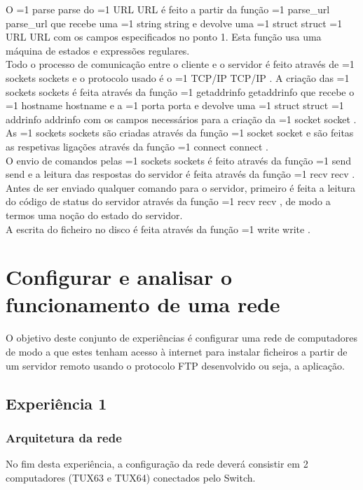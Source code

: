 \documentclass[11pt,a4paper,twocolumn]{article}
\newcommand{\hl}[2][1]{%
  \ifnum#1=1\relax
    \textcolor{text-hl1}{#2}%
  \else
    \textcolor{text-hl2}{#2}%
  \fi
}
\begin{document}
O \hl{parse} do \hl{URL} é feito a partir da função \hl[2]{parse\_url} que recebe uma \hl[2]{string} e devolve uma \hl[2]{struct} \hl{URL} com os campos especificados no ponto 1. Esta função usa uma máquina de estados e expressões regulares. \\
Todo o processo de comunicação entre o cliente e o servidor é feito através de \hl{sockets} e o protocolo usado é o \hl{TCP/IP}. A criação das \hl{sockets} é feita através da função \hl[2]{getaddrinfo} que recebe o \hl[2]{hostname} e a \hl[2]{porta} e devolve uma \hl[2]{struct} \hl{addrinfo} com os campos necessários para a criação da \hl{socket}. \\
As \hl[2]{sockets} são criadas através da função \hl{socket} e são feitas as respetivas ligações através da função \hl[2]{connect}. \\  
O envio de comandos pelas \hl[2]{sockets} é feito através da função \hl[2]{send} e a leitura das respostas do servidor é feita através da função \hl[2]{recv}. \\
Antes de ser enviado qualquer comando para o servidor, primeiro é feita a leitura do código de status do servidor através da função \hl[2]{recv}, de modo a termos uma noção do estado do servidor. \\
A escrita do ficheiro no disco é feita através da função \hl[2]{write}. \\

\section{Configurar e analisar o funcionamento de uma rede}

O objetivo deste conjunto de experiências é configurar uma rede de computadores de modo a que estes tenham acesso à internet para instalar ficheiros a partir de um servidor remoto usando o protocolo FTP desenvolvido ou seja, a aplicação.

\subsection{Experiência 1}

\subsubsection{Arquitetura da rede}
    
No fim desta experiência, a configuração da rede deverá consistir em 2 computadores (TUX63 e TUX64) conectados pelo Switch.
\end{document}

